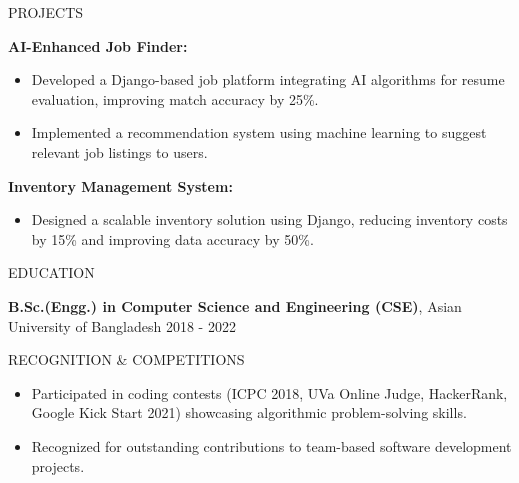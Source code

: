 \documentclass{resume} %
\begin{document}

\begin{rSection}{PROJECTS}

\textbf{AI-Enhanced Job Finder:}
 \begin{itemize}
    \item Developed a Django-based job platform integrating AI algorithms for resume evaluation, improving match accuracy by 25\%.
    \item Implemented a recommendation system using machine learning to suggest relevant job listings to users.
 \end{itemize}

\textbf{Inventory Management System:}
 \begin{itemize}
    \item Designed a scalable inventory solution using Django, reducing inventory costs by 15\% and improving data accuracy by 50\%.
 \end{itemize}

\end{rSection} 


\begin{rSection}{EDUCATION}

{\bf B.Sc.(Engg.) in Computer Science and Engineering (CSE)}, Asian University of Bangladesh \hfill {2018 - 2022}

\end{rSection}


\begin{rSection}{RECOGNITION \& COMPETITIONS}

\begin{itemize}
    \item Participated in coding contests (ICPC 2018, UVa Online Judge, HackerRank, Google Kick Start 2021) showcasing algorithmic problem-solving skills.
    \item Recognized for outstanding contributions to team-based software development projects.
\end{itemize}

\end{rSection}
\end{document}

